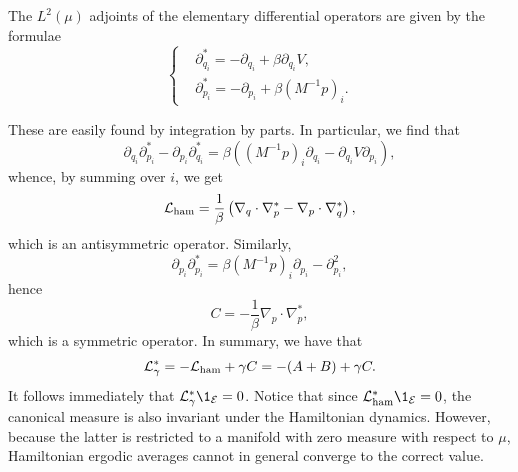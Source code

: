     \begin{lemma}
        \label{lemma:star_adjoints_langevin}
        The $L^2(\mu)$ adjoints of the elementary differential operators are given by the formulae
        \begin{equation}
            \label{eq:star_adjoints_langevin}
            \left\{\begin{aligned}
            &\partial_{q_i}^*=-\partial_{q_i}+\beta\partial_{q_i}V,\\
            &\partial_{p_i}^*=-\partial_{p_i}+\beta\left(M^{-1}p\right)_i.
            \end{aligned}\right.
        \end{equation}
    \end{lemma}
    These are easily found by integration by parts. In particular, we find that 
    $$\partial_{q_i}\partial_{p_i}^*-\partial_{p_i}\partial_{q_i}^*=\beta\left((M^{-1}p)_i\partial_{q_i}-\partial_{q_i}V\partial_{p_i}\right),$$
    whence, by summing over $i$, we get 
    \begin{equation}
        \label{eq:L_ham_antisymmetric}
        \mathcal{L}_{\rm ham}=\frac1\beta\left(\nabla_q\cdot\nabla_p^*-\nabla_p\cdot\nabla_q^*\right),
    \end{equation}
    which is an antisymmetric operator. Similarly,
    $$\partial_{p_i}\partial_{p_i}^*=\beta(M^{-1}p)_i\partial_{p_i}-\partial_{p_i}^2,$$
    hence
    \begin{equation}
        \label{eq:C_symmetric}
        C=-\frac{1}\beta\nabla_p\cdot\nabla_p^*,
    \end{equation}
    which is a symmetric operator. In summary, we have that 
    \begin{equation}
        \label{eq:L_star}
        \mathcal{L}_\gamma^*=-\mathcal{L}_{\rm ham}+\gamma C=-(A+B)+\gamma C.
    \end{equation}
    It follows immediately that $\cL_\gamma^*\1_{\mathcal E}=0$. Notice that since $\cLham^*\1_{\mathcal E}=0$, the canonical measure is also invariant under the Hamiltonian dynamics. However, because the latter is restricted to a manifold with zero measure with respect to $\mu$, Hamiltonian ergodic averages cannot in general converge to the correct value.
